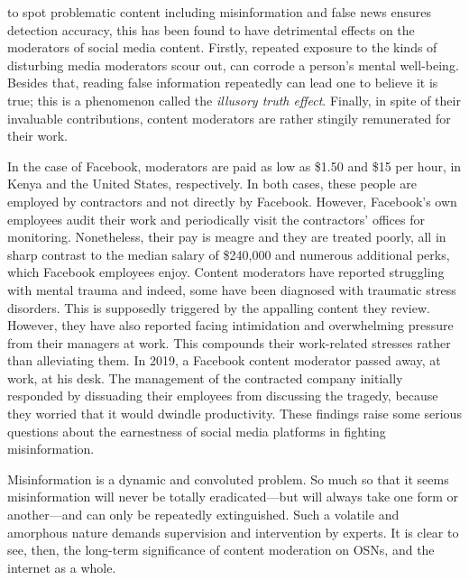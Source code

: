 to spot problematic content including misinformation and false news ensures detection accuracy, this has been found to have detrimental effects on the moderators of social media content. Firstly, repeated exposure to the kinds of disturbing media moderators scour out, can corrode a person's mental well-being. Besides that, reading false information repeatedly can lead one to believe it is true; this is a phenomenon called the \emph{illusory truth effect}. Finally, in spite of their invaluable contributions, content moderators are rather stingily remunerated for their work.

In the case of Facebook, moderators are paid as low as \$1.50 and \$15 per hour, in Kenya and the United States, respectively. In both cases, these people are employed by contractors and not directly by Facebook. However, Facebook's own employees audit their work and periodically visit the contractors' offices for monitoring. Nonetheless, their pay is meagre and they are treated poorly, all in sharp contrast to the median salary of \$240,000 and numerous additional perks, which Facebook employees enjoy. Content moderators have reported struggling with mental trauma and indeed, some have been diagnosed with traumatic stress disorders. This is supposedly triggered by the appalling content they review. However, they have also reported facing intimidation and overwhelming pressure from their managers at work. This compounds their work-related stresses rather than alleviating them. In 2019, a Facebook content moderator passed away, at work, at his desk. The management of the contracted company initially responded by dissuading their employees from discussing the tragedy, because they worried that it would dwindle productivity. These findings raise some serious questions about the earnestness of social media platforms in fighting misinformation.

Misinformation is a dynamic and convoluted problem. So much so that it seems misinformation will never be totally eradicated—but will always take one form or another—and can only be repeatedly extinguished. Such a volatile and amorphous nature demands supervision and intervention by experts. It is clear to see, then, the long-term significance of content moderation on \acp{OSN}, and the internet as a whole.

